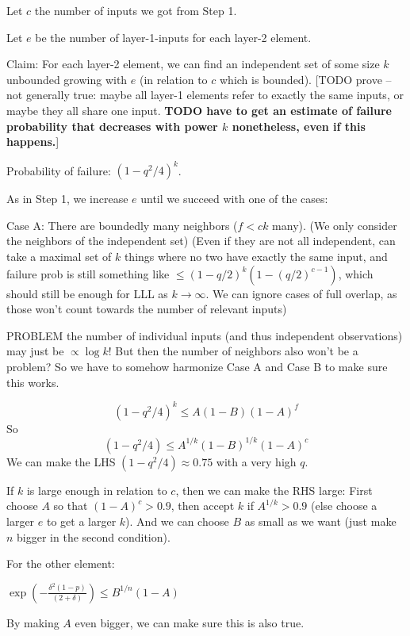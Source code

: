 \documentclass[11pt,a4paper]{article}
\begin{document}
Let $c$ the number of inputs we got from Step 1.

Let $e$ be the number of layer-1-inputs for each layer-2 element.

Claim: For each layer-2 element, we can find an independent set of some size $k$ unbounded growing with $e$ (in relation to $c$ which is bounded). [TODO prove -- not generally true: maybe all layer-1 elements refer to exactly the same inputs, or maybe they all share one input. \textbf{TODO have to get an estimate of failure probability that decreases with power $k$ nonetheless, even if this happens.}]

Probability of failure: $(1-q^2/4)^k$.


As in Step 1, we increase $e$ until we succeed with one of the cases:


Case A: There are boundedly many neighbors ($f < c k$ many). (We only consider the neighbors of the independent set) (Even if they are not all independent, can take a maximal set of $k$ things where no two have exactly the same input, and failure prob is still something like $\leq (1-q/2)^{k} (1-(q/2)^{c-1})$, which should still be enough for LLL as $k \rightarrow \infty$. We can ignore cases of full overlap, as those won't count towards the number of relevant inputs)

PROBLEM the number of individual inputs (and thus independent observations) may just be $\propto \log k$! But then the number of neighbors also won't be a problem? So we have to somehow harmonize Case A and Case B to make sure this works.

\begin{equation}
    (1-q^2/4)^k \leq A(1-B)(1-A)^f
\end{equation}
So
\begin{equation}
    (1-q^2/4) \leq A^{1/k}(1-B)^{1/k}(1-A)^{c}
\end{equation}
We can make the LHS $(1-q^2/4) \approx 0.75$ with a very high $q$.

If $k$ is large enough in relation to $c$, then we can make the RHS large: First choose $A$ so that $(1-A)^c > 0.9$, then accept $k$ if $A^{1/k} > 0.9$ (else choose a larger $e$ to get a larger $k$).
And we can choose $B$ as small as we want (just make $n$ bigger in the second condition).

For the other element:

$ \exp(-\frac{\delta^2(1-p)}{(2+\delta)})  \leq B^{1/n} (1-A)$

By making $A$ even bigger, we can make sure this is also true.
\end{document}
